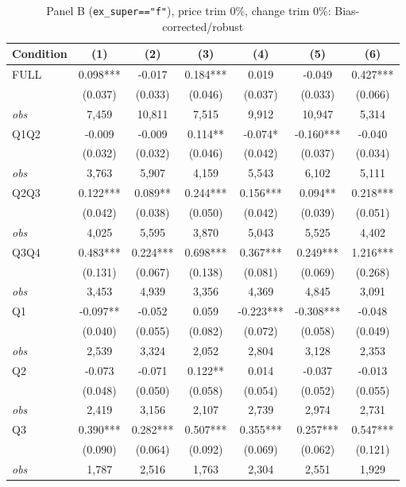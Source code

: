 \documentclass[11pt]{article}
\begin{document}
\begin{table}[!htbp]
\centering
\caption{Panel B (\texttt{ex\_super=="f"}), price trim 0\%, change trim 0\%: Bias-corrected/robust}
\label{tab:b:trim00:robust}
\small
\begin{tabular}{lcccccc}
\toprule
Condition & (1) & (2) & (3) & (4) & (5) & (6) \\
\midrule
FULL & 0.098*** & -0.017 & 0.184*** & 0.019 & -0.049 & 0.427*** \\
 & (0.037) & (0.033) & (0.046) & (0.037) & (0.033) & (0.066) \\
\textit{obs} &  7,459 & 10,811 &  7,515 &  9,912 & 10,947 &  5,314 \\
Q1Q2 & -0.009 & -0.009 & 0.114** & -0.074* & -0.160*** & -0.040 \\
 & (0.032) & (0.032) & (0.046) & (0.042) & (0.037) & (0.034) \\
\textit{obs} & 3,763 & 5,907 & 4,159 & 5,543 & 6,102 & 5,111 \\
Q2Q3 & 0.122*** & 0.089** & 0.244*** & 0.156*** & 0.094** & 0.218*** \\
 & (0.042) & (0.038) & (0.050) & (0.042) & (0.039) & (0.051) \\
\textit{obs} & 4,025 & 5,595 & 3,870 & 5,043 & 5,525 & 4,402 \\
Q3Q4 & 0.483*** & 0.224*** & 0.698*** & 0.367*** & 0.249*** & 1.216*** \\
 & (0.131) & (0.067) & (0.138) & (0.081) & (0.069) & (0.268) \\
\textit{obs} & 3,453 & 4,939 & 3,356 & 4,369 & 4,845 & 3,091 \\
Q1 & -0.097** & -0.052 & 0.059 & -0.223*** & -0.308*** & -0.048 \\
 & (0.040) & (0.055) & (0.082) & (0.072) & (0.058) & (0.049) \\
\textit{obs} & 2,539 & 3,324 & 2,052 & 2,804 & 3,128 & 2,353 \\
Q2 & -0.073 & -0.071 & 0.122** & 0.014 & -0.037 & -0.013 \\
 & (0.048) & (0.050) & (0.058) & (0.054) & (0.052) & (0.055) \\
\textit{obs} & 2,419 & 3,156 & 2,107 & 2,739 & 2,974 & 2,731 \\
Q3 & 0.390*** & 0.282*** & 0.507*** & 0.355*** & 0.257*** & 0.547*** \\
 & (0.090) & (0.064) & (0.092) & (0.069) & (0.062) & (0.121) \\
\textit{obs} & 1,787 & 2,516 & 1,763 & 2,304 & 2,551 & 1,929 \\

\end{tabular}
\end{table}
\end{document}
